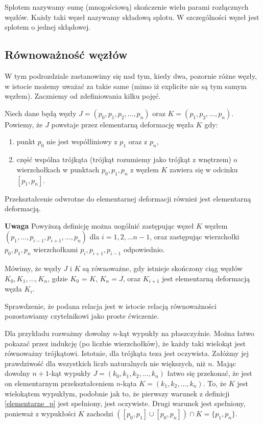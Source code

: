 \begin{definicja}
 Splotem nazywamy sumę (mnogościową) skończenie wielu parami rozłącznych węzłów. Każdy taki węzeł nazywamy składową splotu. W szczególności węzeł jest splotem o jednej skłądowej. 
\end{definicja}

\subsection{Równoważność węzłów}
W tym podrozdziale zastanowimy się nad tym, kiedy dwa, pozornie różne węzły, w istocie możemy uważać za takie same (mimo iż explicite nie są tym samym węzłem). 
Zaczniemy od zdefiniowania kilku pojęć.

\begin{definicja}
\label{elementarne_p}
 Niech dane będą węzły $J = (p_0, p_1, p_2, \ldots, p_n)$ oraz $K = (p_1, p_2, \ldots, p_n)$. 
 Powiemy, że $J$ powstaje przez elementarną deformację węzła $K$ gdy: 
 \begin{enumerate}
  \item punkt $p_0$ nie jest współliniowy z $p_{1}$ oraz z $p_{n}$,
  \item część wspólna trójkąta (trójkąt rozumiemy jako trójkąt z wnętrzem) o wierzchołkach w punktach $p_0, p_1, p_n$ z węzłem $K$ zawiera się w odcinku $[p_1, p_n]$.
 \end{enumerate}
 Przekształcenie odwrotne do elementarnej deformacji również jest elementarną deformacją.
\end{definicja}
\textbf{Uwaga} Powyższą definicję można uogólnić zastępując węzeł $K$ węzłem $(p_1,\ldots, p_{i-1},p_{i+1}, \ldots, p_n)$ dla $i = 1,2,\ldots n-1$, oraz zastępując wierzchołki
$p_0, p_1, p_n$ wierzchołkami $p_i, p_{i+1}, p_{i-1}$ odpowiednio.

\begin{definicja}
 Mówimy, że węzły $J$ i $K$ są równoważne, gdy istnieje skończony ciąg węzłów $K_0, K_1, \ldots, K_n$, gdzie $K_0$ = $K$, $K_n = J$, oraz $K_{i+1}$ jest elementarną
 deformacją węzła $K_i$. 
\end{definicja}

Sprawdzenie, że podana relacja jest w istocie relacją równoważności pozostawiamy czytelnikowi jako proste ćwiczenie.

Dla przykładu rozważmy dowolny $n$-kąt wypukły na płaszczyźnie. Można łatwo pokazać przez indukcję (po liczbie wierzchołków), że każdy taki wielokąt jest równoważny trójkątowi. 
Istotnie, dla trójkąta
teza jest oczywista. Załóżmy jej prawdziwość dla wszystkich liczb naturalnych nie większych, niż $n$. Mając dowolny $n+1$-kąt wypukły $J = (k_0, k_1, k_2, \ldots, k_n)$ łatwo się przekonać,
że jest on elementarnym przekształceniem $n$-kąta $ K = (k_1, k_2, \ldots, k_n)$. To, że $K$ jest wielokątem wypukłym, podobnie jak to, że pierwszy warunek z definicji \ref{elementarne_p} jest spełniony, jest oczywiste.
Drugi warunek jest spełniony, ponieważ z wypukłości $K$ zachodzi $\left([p_0,p_1]\cup [p_0, p_n]\right) \cap K = \lbrace p_1, p_n\rbrace$.

